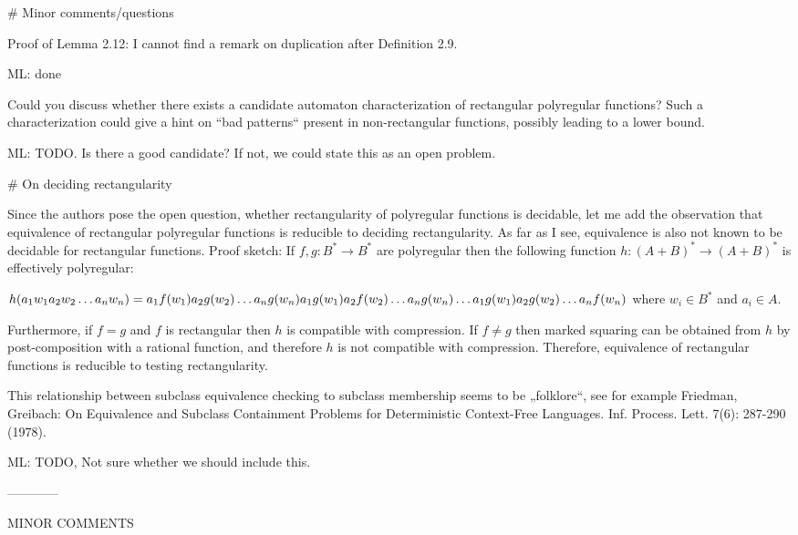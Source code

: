 # Minor comments/questions

Proof of Lemma 2.12: I cannot find a remark on duplication after Definition 2.9.

ML: done

Could you discuss whether there exists a candidate automaton characterization of rectangular polyregular functions? Such a characterization could give a hint on “bad patterns“ present in non-rectangular functions, possibly leading to a lower bound.

ML: TODO. Is there a good candidate? If not, we could state this as an open problem.

# On deciding rectangularity

Since the authors pose the open question, whether rectangularity of polyregular functions is decidable, let me add the observation that equivalence of rectangular polyregular functions is reducible to deciding rectangularity. As far as I see, equivalence is also not known to be decidable for rectangular functions. Proof sketch: If $f,g \colon B^* \to B^*$ are polyregular then the following function $h \colon (A+B)^* \to (A+B)^*$ is effectively polyregular:

$h(a_1 w_1 a_2 w_2 \dots a_n w_n) = \\ a_1 f(w_1) a_2 g(w_2) \dots a_n g(w_n) \\ a_1 g(w_1) a_2 f(w_2) \dots a_n g(w_n) \\ \dots \\ a_1 g(w_1) a_2 g(w_2) \dots a_n f(w_n)$
where $w_i \in B^*$ and $a_i \in A$.

Furthermore, if $f = g$ and $f$ is rectangular then $h$ is compatible with compression. If $f \neq g$ then marked squaring can be obtained from $h$ by post-composition with a rational function, and therefore $h$ is not compatible with compression. Therefore, equivalence of rectangular functions is reducible to testing rectangularity.

This relationship between subclass equivalence checking to subclass membership seems to be „folklore“, see for example Friedman, Greibach: On Equivalence and Subclass Containment Problems for Deterministic Context-Free Languages. Inf. Process. Lett. 7(6): 287-290 (1978).

ML: TODO, Not sure whether we should include this.

------------


MINOR COMMENTS

